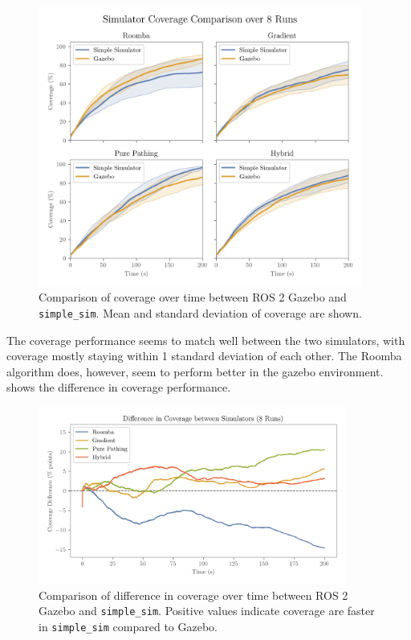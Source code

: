 \begin{figure}[H]
    \centering
    \includegraphics[width=0.95\textwidth]{./figures/plots/consistency/gazebo_vs_simple_sim_coverage.png}
    \caption{Comparison of coverage over time between ROS 2 Gazebo and \texttt{simple\_sim}. Mean and standard deviation of coverage are shown.}
    \label{fig:coverage-benchmark-all}
\end{figure}

The coverage performance seems to match well between the two simulators, with coverage mostly staying within 1 standard deviation of each other. The Roomba algorithm does, however, seem to perform better in the gazebo environment.  shows the difference in coverage performance.

\begin{figure}[H]
    \begin{center}
        \includegraphics[width=0.90\textwidth]{./figures/plots/consistency/sim_coverage_diff.png}
    \end{center}
    \caption{Comparison of difference in coverage over time between ROS 2 Gazebo and \texttt{simple\_sim}. Positive values indicate coverage are faster in \texttt{simple\_sim} compared to Gazebo.}
    \label{fig:coverage-benchmark-diff}
\end{figure}

